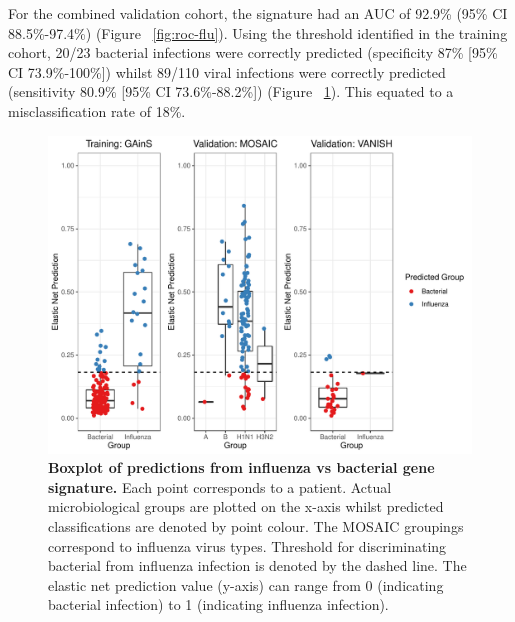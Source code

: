 For the combined validation cohort, the signature had an AUC of 92.9\% (95\% CI 88.5\%-97.4\%) (Figure ~\ref{fig:roc-flu}). Using the threshold identified in the training cohort, 20/23 bacterial infections were correctly predicted (specificity 87\% [95\% CI 73.9\%-100\%]) whilst 89/110 viral infections were correctly predicted (sensitivity 80.9\% [95\% CI 73.6\%-88.2\%]) (Figure ~\ref{fig:boxplot-flu}). This equated to a misclassification rate of 18\%. 

\FloatBarrier
\begin{figure}[htbp]
\centering
\includegraphics[width=\textwidth]{./Results3/Images/boxplot-influenza-signature.pdf}
\caption[Boxplot of influenza vs bacterial signature]{\textbf{Boxplot of predictions from influenza vs bacterial gene signature.} Each point corresponds to a patient. Actual microbiological groups are plotted on the x-axis whilst predicted classifications are denoted by point colour. The MOSAIC groupings correspond to influenza virus types. Threshold for discriminating bacterial from influenza infection is denoted by the dashed line. The elastic net prediction value (y-axis) can range from 0 (indicating bacterial infection) to 1 (indicating influenza infection).}
\label{fig:boxplot-flu}
\end{figure}
\FloatBarrier


